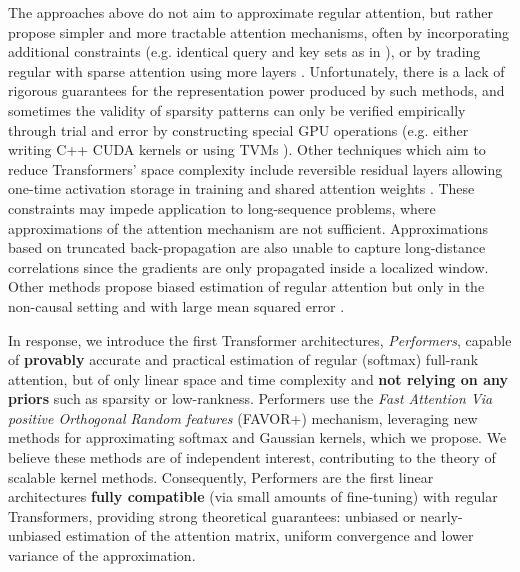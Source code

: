 The approaches above do not aim to approximate regular attention, but rather propose simpler and more tractable attention mechanisms, often by incorporating additional constraints (e.g. identical query and key sets as in \citep{reformer}), or by trading regular with sparse attention using more layers \citep{sparsetr}. Unfortunately, there is a lack of rigorous guarantees for the representation power produced by such methods, and sometimes the validity of sparsity patterns can only be verified empirically through trial and error by constructing special GPU operations (e.g. either writing C++ CUDA kernels \citep{sparsetr} or using TVMs \citep{longformer}). Other techniques %
which aim to reduce %
Transformers' space complexity include reversible residual layers allowing one-time activation storage in training \citep{reformer} and shared attention weights \citep{shared_weights}. These constraints may impede application %
to long-sequence problems, where approximations of the attention mechanism are not sufficient. Approximations based on truncated back-propagation \citep{transformerxl} are also unable to capture long-distance correlations since the gradients are only propagated inside a localized window.
Other methods propose biased estimation of %
regular attention but only in the non-causal setting and with large mean squared error \citep{linformer}.


In response, we introduce the first Transformer architectures, \textit{Performers}, capable of \textbf{provably} accurate and practical estimation of regular (softmax) full-rank attention, but of only linear space and time complexity and \textbf{not relying on any priors} such as sparsity or low-rankness. Performers use the \textit{Fast Attention Via positive Orthogonal Random features} (FAVOR+) mechanism, leveraging new methods for approximating softmax and Gaussian kernels, which we propose. We believe these methods are of independent interest, contributing to the theory of scalable kernel methods. 
Consequently, Performers are the first linear architectures \textbf{fully compatible} (via small amounts of fine-tuning) with regular Transformers, providing strong theoretical guarantees: unbiased or nearly-unbiased estimation of the attention matrix, uniform convergence and lower variance of the approximation.

